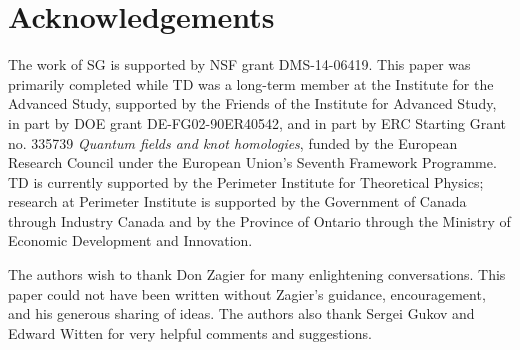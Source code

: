 \documentclass[12pt]{amsart}
\theoremstyle{definition}
\begin{document}
\section*{Acknowledgements}

The work of SG is supported by NSF grant DMS-14-06419. This paper was primarily completed
while TD was a long-term member at the Institute for the Advanced Study, supported by the Friends of the Institute for Advanced Study, in part by DOE grant DE-FG02-90ER40542, and in part by 
ERC Starting Grant no. 335739 {\em Quantum fields and knot homologies}, 
funded by the European Research Council under the European Union's 
Seventh Framework Programme. TD is currently supported by the Perimeter Institute for Theoretical Physics; research at Perimeter Institute is supported by the Government of Canada through Industry Canada and by the Province of Ontario through the Ministry of Economic Development and Innovation.

The authors wish to thank Don Zagier for many enlightening conversations.
This paper could not have been written without Zagier's guidance,  
encouragement, and his generous sharing of ideas. The authors also thank
Sergei Gukov and Edward Witten for very helpful comments and suggestions.



\end{document}

